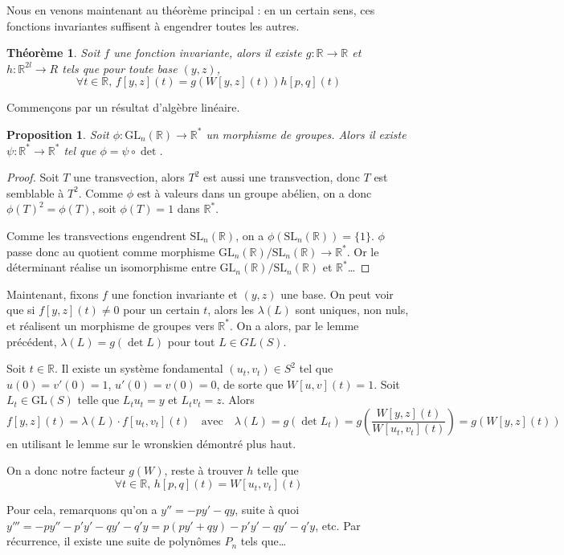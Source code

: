 \documentclass[a4paper, 11pt]{article}
\def\R{\mathbb{R}}
\def\GL{\mathrm{GL}}
\def\SL{\mathrm{SL}}
\newtheorem*{proposition}{Proposition}
\newtheorem*{theorem}{Théorème}
\begin{document}
Nous en venons maintenant au théorème principal : en un certain sens, ces
fonctions invariantes suffisent à engendrer toutes les autres.

\begin{theorem}
  Soit $f$ une fonction invariante, alors il existe $g : \R \to \R$ et $h :
  \R^{2l} \to R$ tels que pour toute base $(y,z)$,
  \[ \forall t \in \R,\, f[y,z](t) = g(W[y,z](t))h[p,q](t) \]
\end{theorem}

Commençons par un résultat d'algèbre linéaire.

\begin{proposition}
  Soit $\phi : \GL_n(\R) \to \R^*$ un morphisme de groupes. Alors il existe
  $\psi : \R^* \to \R^*$ tel que $\phi = \psi \circ \det$.
\end{proposition}
\begin{proof}
  Soit $T$ une transvection, alors $T^2$ est aussi une transvection, donc $T$ est
  semblable à $T^2$. Comme $\phi$ est à valeurs dans un groupe abélien, on a
  donc $\phi(T)^2 = \phi(T)$, soit $\phi(T) = 1$ dans $\R^*$.

  Comme les transvections engendrent $\SL_n(\R)$, on a $\phi(\SL_n(\R)) =
  \{1\}$. $\phi$ passe donc au quotient comme morphisme $\GL_n(\R)/\SL_n(\R) \to
  \R^*$. Or le déterminant réalise un isomorphisme entre $\GL_n(\R)/\SL_n(\R)$
  et $\R^*$…
\end{proof}

Maintenant, fixons $f$ une fonction invariante et $(y,z)$ une base. On peut voir
que si $f[y,z](t) \neq 0$ pour un certain $t$, alors les $\lambda(L)$ sont
uniques, non nuls, et réalisent un morphisme de groupes vers $\R^*$. On a alors,
par le lemme précédent, $\lambda(L) = g(\det L)$ pour tout $L \in GL(S)$.

Soit $t \in \R$. Il existe un système fondamental $(u_t, v_t) \in S^2$ tel que
$u(0) = v'(0) = 1$, $u'(0) = v(0) = 0$, de sorte que $W[u,v](t) = 1$. Soit $L_t
\in \GL(S)$ telle que $L_tu_t = y$ et $L_tv_t = z$. Alors
\[ f[y,z](t) = \lambda(L) \cdot f[u_t,v_t](t) \quad \text{avec} \quad
  \lambda(L) = g(\det L_t) = g\left( \frac{W[y,z](t)}{W[u_t,v_t](t)} \right)
    = g(W[y,z](t))
\]
en utilisant le lemme sur le wronskien démontré plus haut.

On a donc notre facteur $g(W)$, reste à trouver $h$ telle que
\[ \forall t \in \R,\, h[p,q](t) = W[u_t, v_t](t) \]

Pour cela, remarquons qu'on a $y'' = -py' - qy$, suite à quoi $y''' = -py'' -
p'y' - qy' - q'y = p(py'+qy) - p'y' - qy' - q'y$, etc. Par récurrence, il existe
une suite de polynômes $P_n$ tels que…
\end{document}
